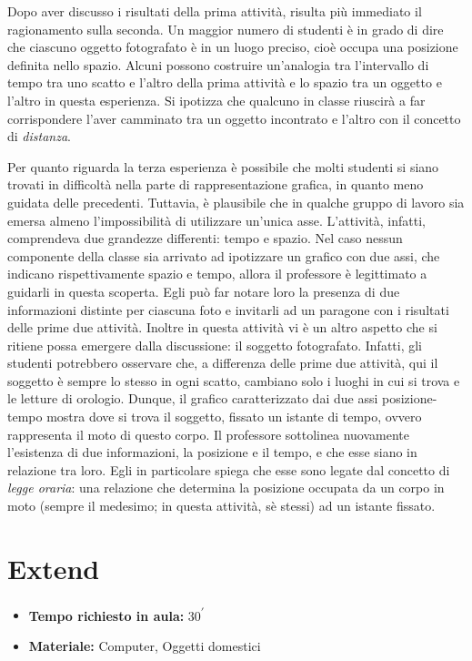 \documentclass{report} \usepackage[T1]{fontenc} \usepackage[italian]{babel}
\begin{document}
Dopo aver discusso i risultati della prima attività, risulta più immediato il
ragionamento sulla seconda. Un maggior numero di studenti è in grado di dire
che ciascuno oggetto fotografato è in un luogo preciso, cioè occupa una
posizione definita nello spazio. Alcuni possono costruire un’analogia tra
l’intervallo di tempo tra uno scatto e l’altro della prima attività e lo spazio
tra un oggetto e l’altro in questa esperienza. Si ipotizza che qualcuno in
classe riuscirà a far corrispondere l’aver camminato tra un oggetto incontrato
e l’altro con il concetto di \emph{distanza}.

Per quanto riguarda la terza esperienza è possibile che molti studenti si siano
trovati in difficoltà nella parte di rappresentazione grafica, in quanto meno
guidata delle precedenti. Tuttavia, è plausibile che in qualche gruppo di
lavoro sia emersa almeno l’impossibilità di utilizzare un’unica asse.
L’attività, infatti, comprendeva due grandezze differenti: tempo e spazio.
Nel caso nessun componente della classe sia arrivato ad ipotizzare un grafico
con due assi, che indicano rispettivamente spazio e tempo, allora il professore
è legittimato a guidarli in questa scoperta. Egli può far notare loro la
presenza di due informazioni distinte per ciascuna foto e invitarli ad un
paragone con i risultati delle prime due attività.
Inoltre in questa attività vi è un altro aspetto che si ritiene possa emergere
dalla discussione: il soggetto fotografato. Infatti, gli studenti potrebbero
osservare che, a differenza delle prime due attività, qui il soggetto è sempre
lo stesso in ogni scatto, cambiano solo i luoghi in cui si trova e le letture
di orologio. Dunque, il grafico caratterizzato dai due assi posizione-tempo
mostra dove si trova il soggetto, fissato un istante di tempo, ovvero rappresenta
il moto di questo corpo. Il professore sottolinea nuovamente l’esistenza di
due informazioni, la posizione e il tempo, e che esse siano in relazione tra
loro. Egli in particolare spiega che esse sono legate dal concetto
di \emph{legge oraria}:  una relazione che determina la posizione occupata da un
corpo  in moto (sempre il medesimo; in questa attività, sè stessi) ad un istante
fissato.

\section{Extend}
\begin{itemize}
\item \textbf{Tempo richiesto in aula:} 30\textsuperscript{$\prime$}
\item \textbf{Materiale:} Computer, Oggetti domestici
\end{itemize}
\end{document}
